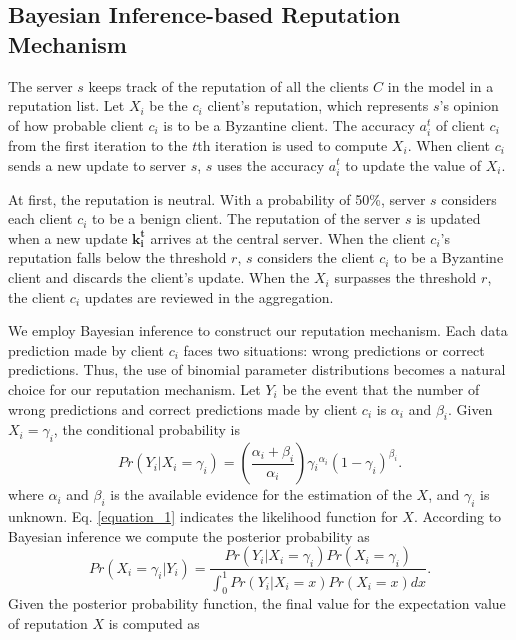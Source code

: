 \documentclass[lettersize,journal]{IEEEtran}
\begin{document}
\subsection{Bayesian Inference-based Reputation Mechanism}
The server $s$ keeps track of the reputation of all the clients $C$ in the model in a reputation list. Let $X_i$ be the $c_i$ client's reputation, which represents $s$'s opinion of how probable client $c_i$ is to be a Byzantine client. The accuracy $a_i^t$ of client $c_i$ from the first iteration to the $t$th iteration is used to compute $X_i$. When client $c_i$ sends a new update to server $s$, $s$ uses the accuracy $a_i^t$ to update the value of $X_i$.
\par At first, the reputation is neutral. With a probability of 50\%, server $s$ considers each client $c_i$ to be a benign client. The reputation of the server $s$ is updated when a new update $\mathbf{k_i^t}$ arrives at the central server. When the client $c_i$'s reputation falls below the threshold $r$, $s$ considers the client $c_i$ to be a Byzantine client and discards the client's update. When the $X_i$ surpasses the threshold $r$, the client $c_i$ updates are reviewed in the aggregation.
\par We employ Bayesian inference to construct our reputation mechanism. Each data prediction made by client $c_i$ faces two situations: wrong predictions or correct predictions. Thus, the use of binomial parameter distributions becomes a natural choice for our reputation mechanism. Let $Y_i$ be the event that the number of wrong predictions and correct predictions made by client $c_i$ is $\alpha_i$ and $\beta_i$. Given $X_i=\gamma_i$, the conditional probability is 
\begin{equation}
  Pr(Y_i|X_i=\gamma _i)=\left ( \frac{\alpha _i+\beta _i}{\alpha _i} \right )\gamma {_{i}}^{\alpha_i}\left ( 1-\gamma_{i} \right )^{\beta_{i}}\label{equation_1}.
\end{equation}
where $\alpha_i$ and $\beta_i$ is the available evidence for the estimation of the $X$, and $\gamma_i$ is unknown. Eq. \ref{equation_1} indicates the likelihood function for $X$. According to Bayesian inference we compute the posterior probability as
\begin{equation}
  Pr(X_i=\gamma _i|Y_i)=\frac{Pr\left ( Y_{i}|X_{i}=\gamma_{i} \right )Pr(X_{i}=\gamma_{i})}{\int_{0}^{1}Pr\left ( Y_{i}|X_{i}=x \right )Pr(X_{i}=x)dx}\label{equation_2}.
\end{equation}
Given the posterior probability function, the final value for the expectation value of reputation $X$ is computed as
\end{document}
